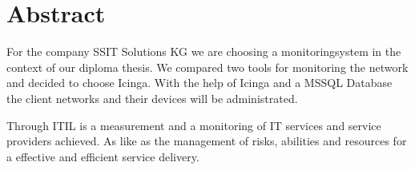\chapter{Abstract}

\begin{english} 
    For the company SSIT Solutions KG we are 
    choosing a monitoringsystem in the context of our diploma thesis.
    We compared two tools for monitoring the network and decided to choose Icinga.
    With the help of Icinga and a MSSQL Database the client 
    networks and their devices will be administrated.

    Through ITIL is a measurement and a monitoring of IT services and 
    service providers achieved. As like as the management of risks, abilities 
    and resources for a effective and efficient service delivery.
\end{english}